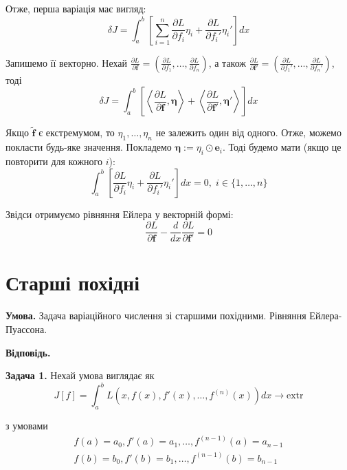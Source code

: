 \documentclass[14pt]{extarticle}
\newcommand{\<}{\langle}
\renewcommand{\>}{\rangle}
\theoremstyle{mystyle}{\newtheorem{definition}{Definition}[section]}
\theoremstyle{mystyle}{\newtheorem{proposition}[definition]{Proposition}}
\theoremstyle{mystyle}{\newtheorem{theorem}[definition]{Theorem}}
\theoremstyle{mystyle}{\newtheorem{lemma}[definition]{Lemma}}
\theoremstyle{mystyle}{\newtheorem{corollary}[definition]{Corollary}}
\theoremstyle{mystyle}{\newtheorem*{remark}{Remark}}
\theoremstyle{mystyle}{\newtheorem*{remarks}{Remarks}}
\theoremstyle{mystyle}{\newtheorem*{example}{Example}}
\theoremstyle{mystyle}{\newtheorem*{examples}{Examples}}
\theoremstyle{definition}{\newtheorem*{exercise}{Exercise}}
\theoremstyle{cstyle}{\newtheorem*{cthm}{}}
\theoremstyle{warn}
\begin{document}
Отже, перша варіація має вигляд:
\begin{equation}
    \delta J = \int_a^b \left[\sum_{i=1}^n \frac{\partial L}{\partial f_i}\eta_i + \frac{\partial L}{\partial f_i'}\eta_i'\right]dx
\end{equation}

Запишемо її векторно. Нехай $\frac{\partial L}{\partial \mathbf{f}} = (\frac{\partial L}{\partial f_1},\dots,\frac{\partial L}{\partial f_n})$, а також $\frac{\partial L}{\partial \mathbf{f}'} = (\frac{\partial L}{\partial f_1'},\dots,\frac{\partial L}{\partial f_n'})$, тоді 
\begin{equation}
    \delta J = \int_a^b \left[\left\langle \frac{\partial L}{\partial\mathbf{f}}, \boldsymbol{\eta} \right\rangle + \left\langle \frac{\partial L}{\partial\mathbf{f}'}, \boldsymbol{\eta}' \right\rangle\right]dx
\end{equation}

Якщо $\widetilde{\mathbf{f}}$ є екстремумом, то $\eta_1,\dots,\eta_n$ не залежить один від одного. Отже, можемо покласти будь-яке значення. Покладемо $\boldsymbol{\eta} := \eta_i \odot \mathbf{e}_i$. 
Тоді будемо мати (якщо це повторити для кожного $i$):
\begin{equation}
    \int_a^b \left[\frac{\partial L}{\partial f_i}\eta_i + \frac{\partial L}{\partial f_i'}\eta_i'\right]dx = 0, \; i \in \{1,\dots,n\}
\end{equation}

Звідси отримуємо рівняння Ейлера у векторній формі:
\begin{equation}
    \frac{\partial L}{\partial \mathbf{f}} - \frac{d}{dx}\frac{\partial L}{\partial \mathbf{f}'} = 0
\end{equation}

\pagebreak

\section{Старші похідні}

\textbf{Умова.} Задача варіаційного числення зі старшими похідними. Рівняння Ейлера-Пуассона.

\textbf{Відповідь.} 

\textbf{Задача 1.} Нехай умова виглядає як
\begin{equation}
    J[f] = \int_a^b L(x,f(x),f'(x),\dots,f^{(n)}(x))dx \to \text{extr}
\end{equation}

з умовами
\begin{gather}
    f(a)=a_0, f'(a)=a_1, \dots, f^{(n-1)}(a)=a_{n-1} \\
    f(b)=b_0, f'(b)=b_1, \dots, f^{(n-1)}(b) =b_{n-1}
\end{gather}
\end{document}
